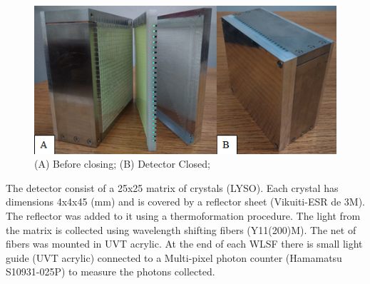 \documentclass[final,5p,times,twocolumn]{elsarticle}
\begin{document}
%
\begin{figure}
\includegraphics[width=0.98\linewidth]{ps_closing}
\caption{(A) Before closing; (B) Detector Closed;}
\end{figure}
%
The detector consist of a 25x25 matrix of crystals (LYSO). Each crystal has dimensions 4x4x45 (mm) and is covered by a reflector sheet (Vikuiti-ESR de 3M). The reflector was added to it using a thermoformation procedure. The light from the matrix is collected using wavelength shifting fibers (Y11(200)M). The net of fibers was mounted in UVT acrylic. At the end of each WLSF there is small light guide (UVT acrylic) connected to a Multi-pixel photon counter (Hamamatsu S10931-025P) to measure the photons collected.
%
%
\end{document}

